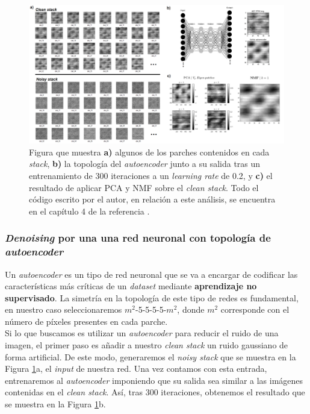 
\newpage

\begin{figure}[h!]
    \centering
    \includegraphics[width=1\textwidth]{fig/Fig17.png}
    \caption{ Figura que muestra \textbf{a)} algunos de los parches contenidos en cada \textit{stack}, \textbf{b)} la topología del \textit{autoencoder} junto a su salida tras un entrenamiento de 300 iteraciones a un \textit{learning rate} de 0.2, y \textbf{c)} el resultado de aplicar PCA y NMF sobre el \textit{clean stack}. Todo el código escrito por el autor, en relación a este análisis, se encuentra en el capítulo 4 de la referencia \cite{repo}.}
    \label{fig:17}
\end{figure}

\subsubsection{\textit{Denoising} por una una red neuronal con topología de \textit{autoencoder}}

Un \textit{autoencoder} es un tipo de red neuronal que se va a encargar de codificar las características más críticas de un \textit{dataset} mediante \textbf{aprendizaje no supervisado}. La simetría en la topología de este tipo de redes es fundamental, en nuestro caso seleccionaremos $m^2$-5-5-5-5-$m^2$, donde $m^2$ corresponde con el número de píxeles presentes en cada parche.\\

Si lo que buscamos es utilizar un \textit{autoencoder} para reducir el ruido de una imagen, el primer paso es añadir a nuestro \textit{clean stack} un ruido gaussiano de forma artificial. De este modo, generaremos el \textit{noisy stack} que se muestra en la Figura \ref{fig:17}a, el \textit{input} de nuestra red. Una vez contamos con esta entrada, entrenaremos al \textit{autoencoder} imponiendo que su salida sea similar a las imágenes contenidas en el \textit{clean stack}. Así, tras 300 iteraciones, obtenemos el resultado que se muestra en la Figura \ref{fig:17}b.




